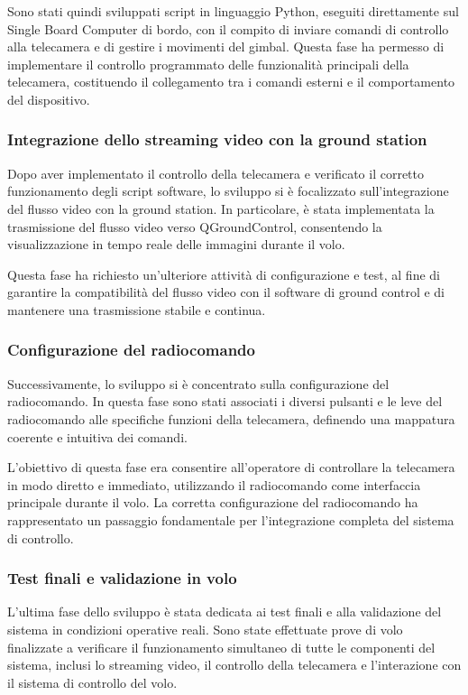 Sono stati quindi sviluppati script in linguaggio Python, eseguiti direttamente sul Single Board Computer di bordo, con il compito di inviare comandi di controllo alla telecamera e di gestire i movimenti del gimbal.  
Questa fase ha permesso di implementare il controllo programmato delle funzionalità principali della telecamera, costituendo il collegamento tra i comandi esterni e il comportamento del dispositivo.

\subsubsection{Integrazione dello streaming video con la ground station}

Dopo aver implementato il controllo della telecamera e verificato il corretto funzionamento degli script software, lo sviluppo si è focalizzato sull’integrazione del flusso video con la ground station.  
In particolare, è stata implementata la trasmissione del flusso video verso QGroundControl, consentendo la visualizzazione in tempo reale delle immagini durante il volo.

Questa fase ha richiesto un’ulteriore attività di configurazione e test, al fine di garantire la compatibilità del flusso video con il software di ground control e di mantenere una trasmissione stabile e continua.

\subsubsection{Configurazione del radiocomando}

Successivamente, lo sviluppo si è concentrato sulla configurazione del radiocomando.  
In questa fase sono stati associati i diversi pulsanti e le leve del radiocomando alle specifiche funzioni della telecamera, definendo una mappatura coerente e intuitiva dei comandi.

L’obiettivo di questa fase era consentire all’operatore di controllare la telecamera in modo diretto e immediato, utilizzando il radiocomando come interfaccia principale durante il volo.  
La corretta configurazione del radiocomando ha rappresentato un passaggio fondamentale per l’integrazione completa del sistema di controllo.

\subsubsection{Test finali e validazione in volo}

L’ultima fase dello sviluppo è stata dedicata ai test finali e alla validazione del sistema in condizioni operative reali.  
Sono state effettuate prove di volo finalizzate a verificare il funzionamento simultaneo di tutte le componenti del sistema, inclusi lo streaming video, il controllo della telecamera e l’interazione con il sistema di controllo del volo.

